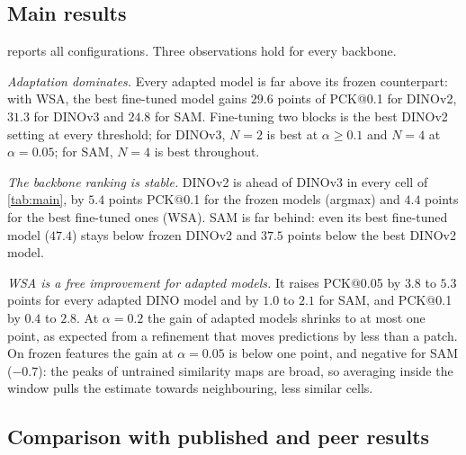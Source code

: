 \subsection{Main results}
\label{sec:main_results}



 reports all configurations. Three observations hold for every backbone.

\emph{Adaptation dominates.} Every adapted model is far above its frozen counterpart: with WSA, the best fine-tuned model gains $29.6$ points of PCK@0.1 for DINOv2, $31.3$ for DINOv3 and $24.8$ for SAM. Fine-tuning two blocks is the best DINOv2 setting at every threshold; for DINOv3, $N{=}2$ is best at $\alpha\geq0.1$ and $N{=}4$ at $\alpha{=}0.05$; for SAM, $N{=}4$ is best throughout.

\emph{The backbone ranking is stable.} DINOv2 is ahead of DINOv3 in every cell of \cref{tab:main}, by $5.4$ points PCK@0.1 for the frozen models (argmax) and $4.4$ points for the best fine-tuned ones (WSA). SAM is far behind: even its best fine-tuned model ($47.4$) stays below frozen DINOv2 and $37.5$ points below the best DINOv2 model.

\emph{WSA is a free improvement for adapted models.} It raises PCK@0.05 by $3.8$ to $5.3$ points for every adapted DINO model and by $1.0$ to $2.1$ for SAM, and PCK@0.1 by $0.4$ to $2.8$. At $\alpha{=}0.2$ the gain of adapted models shrinks to at most one point, as expected from a refinement that moves predictions by less than a patch. On frozen features the gain at $\alpha{=}0.05$ is below one point, and negative for SAM ($-0.7$): the peaks of untrained similarity maps are broad, so averaging inside the window pulls the estimate towards neighbouring, less similar cells.

\subsection{Comparison with published and peer results}
\label{sec:comparison}

